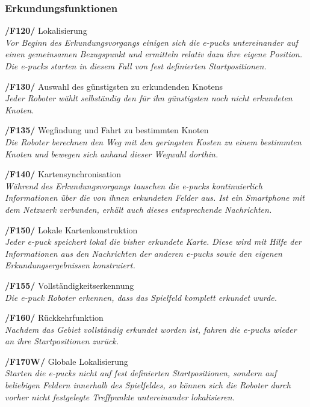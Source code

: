 \documentclass[10pt,a4paper]{article}
\begin{document}
			\subsubsection{Erkundungsfunktionen}
				\begin{list}{}{\leftmargin=1cm}
					\item[\textbf{/F120/}] Lokalisierung
						\\ \textsl{Vor Beginn des Erkundungsvorgangs einigen sich die e-pucks untereinander auf einen gemeinsamen Bezugspunkt
						und ermitteln relativ dazu ihre eigene Position. Die e-pucks starten in diesem Fall von fest definierten Startpositionen.}
					\item[\textbf{/F130/}] Auswahl des günstigsten zu erkundenden Knotens
						\\ \textsl{Jeder Roboter wählt selbständig den für ihn günstigsten noch nicht erkundeten Knoten.}
					\item[\textbf{/F135/}] Wegfindung und Fahrt zu bestimmten Knoten
						\\ \textsl{Die Roboter berechnen den Weg mit den geringsten Kosten zu einem bestimmten Knoten und bewegen sich
							anhand dieser Wegwahl dorthin.}
					\item[\textbf{/F140/}] Kartensynchronisation
						\\ \textsl{Während des Erkundungsvorgangs tauschen die e-pucks kontinuierlich Informationen über die von ihnen
						erkundeten Felder aus. Ist ein Smartphone mit dem Netzwerk verbunden, erhält auch dieses entsprechende Nachrichten.}
					\item[\textbf{/F150/}] Lokale Kartenkonstruktion	
						\\ \textsl{Jeder e-puck speichert lokal die bisher erkundete Karte. Diese wird mit Hilfe
						der Informationen aus den Nachrichten der anderen e-pucks sowie den eigenen Erkundungsergebnissen konstruiert.} 				
					\item[\textbf{/F155/}] Vollständigkeitserkennung 
						\\ \textsl{Die e-puck Roboter erkennen, dass das Spielfeld komplett erkundet wurde.} 	
					\item[\textbf{/F160/}] Rückkehrfunktion
						\\ \textsl{Nachdem das Gebiet vollständig erkundet worden ist, fahren die e-pucks wieder an ihre Startpositionen
						zurück.}
					\item[\textbf{/F170W/}] Globale Lokalisierung
						\\ \textsl{Starten die e-pucks nicht auf fest definierten Startpositionen, sondern auf beliebigen Feldern innerhalb
							des Spielfeldes, so können sich die Roboter durch vorher nicht festgelegte Treffpunkte untereinander lokalisieren.}
				\end{list}
\end{document}

